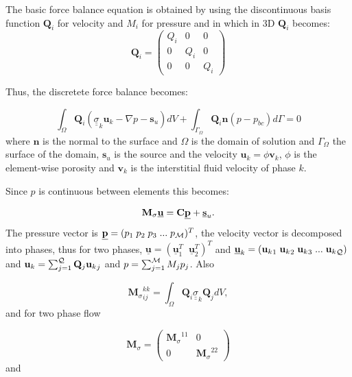 The basic force balance equation is obtained by
using the discontinuous basis function ${\mathbf Q}_i$ for velocity and
$M_i$ for pressure and in which in 3D ${\mathbf Q}_i$ becomes:
\begin{equation}
{\mathbf Q}_i =
  \begin{pmatrix}
    Q_i   & 0 & 0 \\
    0   & Q_i & 0 \\
    0 & 0 & Q_i
  \end{pmatrix}
\label{pipe-m_sigma_matrix}
\end{equation}

Thus, the discretete force balance becomes:

\begin{equation}
\int_\Omega {\mathbf Q}_i ({\underline {\underline \sigma}}_k {\mathbf u}_k - \nabla p -{\mathbf s}_u) dV
+  \int_{\Gamma_{\Omega}} {\mathbf Q}_i {\mathbf n} (p - p_{bc}) d\Gamma =0
\label{pipe-force-semi-disc}
\end{equation}
where ${\mathbf n}$ is the normal to the surface
and $\Omega$ is the domain of solution and
${\Gamma_{\Omega}}$ the surface of the domain, ${\mathbf s}_u$ is
the source and the velocity ${\mathbf u}_k = \phi {\mathbf v}_k$,
$\phi$ is the
element-wise
porosity and ${\mathbf v}_k$ is the interstitial fluid velocity of phase $k$.

Since $p$ is continuous between elements this becomes:

\begin{equation}
{\mathbf M}_\sigma \underline {\mathbf u} = {\mathbf C} \underline {\bf p}
+ \underline {\bf s}_u.
\label{pipe-force-balance-matrix-form}
\end{equation}
The pressure vector is $\underline{\bf p} =(p_1\; p_2 \; p_3\; ...\; p_{\cal M})^T$,
the velocity vector is decomposed into phases, thus for two phases,
$\underline{\mathbf u}=(\underline{\mathbf u}_1^T \;\; \underline{\mathbf u}_2^T)^T$
and $\underline{\mathbf u}_k=({{\mathbf u}_k}_1\; {{\mathbf u}_k}_2\; {{\mathbf u}_k}_3\; ...\; {{\mathbf u}_k}_{\cal Q}) $
and ${\mathbf u}_k = \sum_{j=1}^{\cal Q} {\mathbf Q}_j{{\mathbf u}_k}_j$ and
$p=\sum_{j=1}^{\cal M} M_j{p}_j$. Also


\begin{equation}
{{\mathbf M}_\sigma}^{kk}_{ij} =  \int_\Omega {\mathbf Q}_i
{\underline {\underline \sigma}}_k {\mathbf Q}_j dV,
\end{equation}
and for two phase flow

\begin{equation}
{{\mathbf M}_\sigma} =
  \begin{pmatrix}
    {{\mathbf M}_\sigma}^{11}   & 0 \\
    0   & {{\mathbf M}_\sigma}^{22}
  \end{pmatrix}
\label{pipe-m_sigma_matrix}
\end{equation}
and

